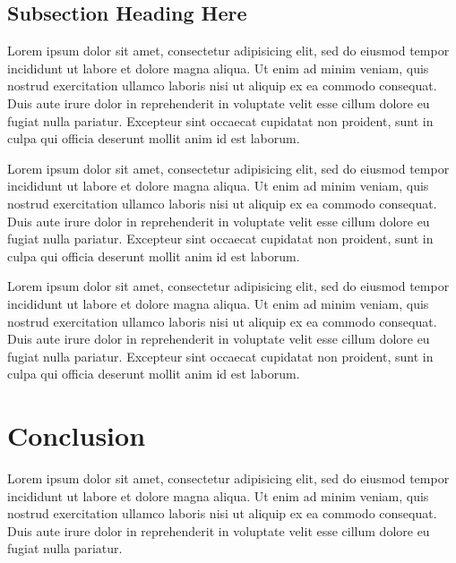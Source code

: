 \documentclass{article}
\begin{document}
\subsection{Subsection Heading Here}

Lorem ipsum dolor sit amet, consectetur adipisicing elit, sed do eiusmod tempor
incididunt ut labore et dolore magna aliqua. Ut enim ad minim veniam, quis
nostrud exercitation ullamco laboris nisi ut aliquip ex ea commodo consequat.
Duis aute irure dolor in reprehenderit in voluptate velit esse cillum dolore eu
fugiat nulla pariatur. Excepteur sint occaecat cupidatat non proident, sunt in
culpa qui officia deserunt mollit anim id est laborum.

Lorem ipsum dolor sit amet, consectetur adipisicing elit, sed do eiusmod tempor
incididunt ut labore et dolore magna aliqua. Ut enim ad minim veniam, quis
nostrud exercitation ullamco laboris nisi ut aliquip ex ea commodo consequat.
Duis aute irure dolor in reprehenderit in voluptate velit esse cillum dolore eu
fugiat nulla pariatur. Excepteur sint occaecat cupidatat non proident, sunt in
culpa qui officia deserunt mollit anim id est laborum.

Lorem ipsum dolor sit amet, consectetur adipisicing elit, sed do eiusmod tempor
incididunt ut labore et dolore magna aliqua. Ut enim ad minim veniam, quis
nostrud exercitation ullamco laboris nisi ut aliquip ex ea commodo consequat.
Duis aute irure dolor in reprehenderit in voluptate velit esse cillum dolore eu
fugiat nulla pariatur. Excepteur sint occaecat cupidatat non proident, sunt in
culpa qui officia deserunt mollit anim id est laborum.




\section{Conclusion}

Lorem ipsum dolor sit amet, consectetur adipisicing elit, sed do eiusmod tempor
incididunt ut labore et dolore magna aliqua. Ut enim ad minim veniam, quis
nostrud exercitation ullamco laboris nisi ut aliquip ex ea commodo consequat.
Duis aute irure dolor in reprehenderit in voluptate velit esse cillum dolore eu
fugiat nulla pariatur.
\end{document}
